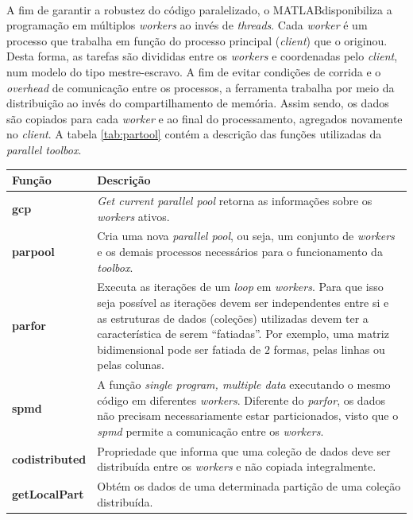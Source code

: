 \documentclass[
    12pt,               %
    openright,          %
    oneside,
    a4paper,            %
    english,            %
    french,             %
    spanish,            %
    brazil              %
    ]{abntex2}
\newcommand{\matlab}{MATLAB\textsuperscript{\textregistered}}
\begin{document}
A fim de garantir a robustez do código paralelizado, o \matlab disponibiliza a programação em múltiplos \textit{workers} ao invés de \textit{threads}. Cada \textit{worker} é um processo que trabalha em função do processo principal (\textit{client}) que o originou. Desta forma, as tarefas são divididas entre os \textit{workers} e coordenadas pelo \textit{client}, num modelo do tipo mestre-escravo. A fim de evitar condições de corrida e o \textit{overhead} de comunicação entre os processos, a ferramenta trabalha por meio da distribuição ao invés do compartilhamento de memória. Assim sendo, os dados são copiados para cada \textit{worker} e ao final do processamento, agregados novamente no \textit{client}. A tabela \ref{tab:partool} contém a descrição das funções utilizadas da \textit{parallel toolbox}.


\begin{table}[!ht]   
	\centering
	\begin{tabular}{|l|p{10cm}|}  
		\hline
		\textbf{Função} 
		& \textbf{Descrição} 
		\\  
		\hline
		\textbf{gcp} 
		& \textit{Get current parallel pool} retorna as informações sobre os \textit{workers} ativos.
		\\
		\hline
		\textbf{parpool}  
		& Cria uma nova \textit{parallel pool}, ou seja, um conjunto de \textit{workers} e os demais processos necessários para o funcionamento da \textit{toolbox}.
		\\
		\hline		
		\textbf{parfor} 
		& Executa as iterações de um \textit{loop} em \textit{workers}. Para que isso seja possível as iterações devem ser independentes entre si e as estruturas de dados (coleções) utilizadas devem ter a característica de serem ``fatiadas''.  Por exemplo, uma matriz bidimensional pode ser fatiada de $2$ formas, pelas linhas ou pelas colunas.
		\\
		\hline		 
		\textbf{spmd} 
		& A função \textit{single program, multiple data} executando o mesmo código em diferentes \textit{workers}. Diferente do \textit{parfor}, os dados não precisam necessariamente estar particionados, visto que o \textit{spmd} permite a comunicação entre os \textit{workers}.
		\\
		\hline		
		\textbf{codistributed} 
		& Propriedade que informa que uma coleção de dados deve ser distribuída entre os \textit{workers} e não copiada integralmente.
		\\
		\hline		 
		\textbf{getLocalPart} 
		& Obtém os dados de uma determinada partição de uma coleção distribuída.
		\\

\end{tabular}
\end{table}
\end{document}
